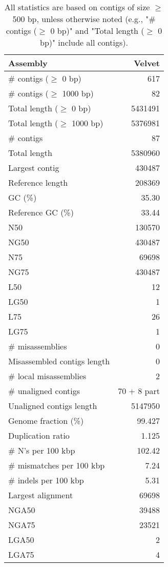 \documentclass[12pt,a4paper]{article}
\begin{document}
\begin{table}[ht]
\begin{center}
\caption{All statistics are based on contigs of size $\geq$ 500 bp, unless otherwise noted (e.g., "\# contigs ($\geq$ 0 bp)" and "Total length ($\geq$ 0 bp)" include all contigs).}
\begin{tabular}{|l*{1}{|r}|}
\hline
Assembly & Velvet \\ \hline
\# contigs ($\geq$ 0 bp) & 617 \\ \hline
\# contigs ($\geq$ 1000 bp) & 82 \\ \hline
Total length ($\geq$ 0 bp) & 5431491 \\ \hline
Total length ($\geq$ 1000 bp) & 5376981 \\ \hline
\# contigs & 87 \\ \hline
Total length & 5380960 \\ \hline
Largest contig & 430487 \\ \hline
Reference length & 208369 \\ \hline
GC (\%) & 35.30 \\ \hline
Reference GC (\%) & 33.44 \\ \hline
N50 & 130570 \\ \hline
NG50 & 430487 \\ \hline
N75 & 69698 \\ \hline
NG75 & 430487 \\ \hline
L50 & 12 \\ \hline
LG50 & 1 \\ \hline
L75 & 26 \\ \hline
LG75 & 1 \\ \hline
\# misassemblies & 0 \\ \hline
Misassembled contigs length & 0 \\ \hline
\# local misassemblies & 2 \\ \hline
\# unaligned contigs & 70 + 8 part \\ \hline
Unaligned contigs length & 5147950 \\ \hline
Genome fraction (\%) & 99.427 \\ \hline
Duplication ratio & 1.125 \\ \hline
\# N's per 100 kbp & 102.42 \\ \hline
\# mismatches per 100 kbp & 7.24 \\ \hline
\# indels per 100 kbp & 5.31 \\ \hline
Largest alignment & 69698 \\ \hline
NGA50 & 39488 \\ \hline
NGA75 & 23521 \\ \hline
LGA50 & 2 \\ \hline
LGA75 & 4 \\ \hline
\end{tabular}
\end{center}
\end{table}
\end{document}
